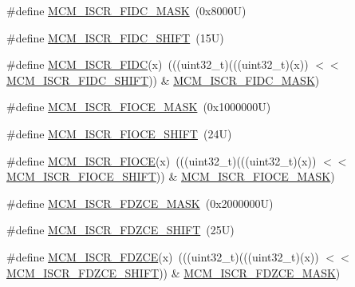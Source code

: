 \begin{DoxyCompactItemize}
\item 
\#define \mbox{\hyperlink{group___m_c_m___register___masks_gaeca36bf639a606a24f7ee6a4fc983528}{M\+C\+M\+\_\+\+I\+S\+C\+R\+\_\+\+F\+I\+D\+C\+\_\+\+M\+A\+SK}}~(0x8000\+U)
\item 
\#define \mbox{\hyperlink{group___m_c_m___register___masks_gaaf16fcce0e380e7f200d910008794028}{M\+C\+M\+\_\+\+I\+S\+C\+R\+\_\+\+F\+I\+D\+C\+\_\+\+S\+H\+I\+FT}}~(15\+U)
\item 
\#define \mbox{\hyperlink{group___m_c_m___register___masks_ga381a7d1a7455f77223d0ccdc4c99dfa3}{M\+C\+M\+\_\+\+I\+S\+C\+R\+\_\+\+F\+I\+DC}}(x)~(((uint32\+\_\+t)(((uint32\+\_\+t)(x)) $<$$<$ \mbox{\hyperlink{group___m_c_m___register___masks_gaaf16fcce0e380e7f200d910008794028}{M\+C\+M\+\_\+\+I\+S\+C\+R\+\_\+\+F\+I\+D\+C\+\_\+\+S\+H\+I\+FT}})) \& \mbox{\hyperlink{group___m_c_m___register___masks_gaeca36bf639a606a24f7ee6a4fc983528}{M\+C\+M\+\_\+\+I\+S\+C\+R\+\_\+\+F\+I\+D\+C\+\_\+\+M\+A\+SK}})
\item 
\#define \mbox{\hyperlink{group___m_c_m___register___masks_gaf48976f7ac1761a6145eea9a6add5ff5}{M\+C\+M\+\_\+\+I\+S\+C\+R\+\_\+\+F\+I\+O\+C\+E\+\_\+\+M\+A\+SK}}~(0x1000000\+U)
\item 
\#define \mbox{\hyperlink{group___m_c_m___register___masks_ga97f10ab969b7c83eb9cde216807b215b}{M\+C\+M\+\_\+\+I\+S\+C\+R\+\_\+\+F\+I\+O\+C\+E\+\_\+\+S\+H\+I\+FT}}~(24\+U)
\item 
\#define \mbox{\hyperlink{group___m_c_m___register___masks_ga40c85d16456dabfa6179d0a8fbc29d8b}{M\+C\+M\+\_\+\+I\+S\+C\+R\+\_\+\+F\+I\+O\+CE}}(x)~(((uint32\+\_\+t)(((uint32\+\_\+t)(x)) $<$$<$ \mbox{\hyperlink{group___m_c_m___register___masks_ga97f10ab969b7c83eb9cde216807b215b}{M\+C\+M\+\_\+\+I\+S\+C\+R\+\_\+\+F\+I\+O\+C\+E\+\_\+\+S\+H\+I\+FT}})) \& \mbox{\hyperlink{group___m_c_m___register___masks_gaf48976f7ac1761a6145eea9a6add5ff5}{M\+C\+M\+\_\+\+I\+S\+C\+R\+\_\+\+F\+I\+O\+C\+E\+\_\+\+M\+A\+SK}})
\item 
\#define \mbox{\hyperlink{group___m_c_m___register___masks_ga2ad0b7495aba7dacde7658c2a71db6bd}{M\+C\+M\+\_\+\+I\+S\+C\+R\+\_\+\+F\+D\+Z\+C\+E\+\_\+\+M\+A\+SK}}~(0x2000000\+U)
\item 
\#define \mbox{\hyperlink{group___m_c_m___register___masks_ga12ce128ef5d64154df362b12c33aa526}{M\+C\+M\+\_\+\+I\+S\+C\+R\+\_\+\+F\+D\+Z\+C\+E\+\_\+\+S\+H\+I\+FT}}~(25\+U)
\item 
\#define \mbox{\hyperlink{group___m_c_m___register___masks_gac82d36cc3bfeb92cf50ac3585324ac06}{M\+C\+M\+\_\+\+I\+S\+C\+R\+\_\+\+F\+D\+Z\+CE}}(x)~(((uint32\+\_\+t)(((uint32\+\_\+t)(x)) $<$$<$ \mbox{\hyperlink{group___m_c_m___register___masks_ga12ce128ef5d64154df362b12c33aa526}{M\+C\+M\+\_\+\+I\+S\+C\+R\+\_\+\+F\+D\+Z\+C\+E\+\_\+\+S\+H\+I\+FT}})) \& \mbox{\hyperlink{group___m_c_m___register___masks_ga2ad0b7495aba7dacde7658c2a71db6bd}{M\+C\+M\+\_\+\+I\+S\+C\+R\+\_\+\+F\+D\+Z\+C\+E\+\_\+\+M\+A\+SK}})
$$
\end{DoxyCompactItemize}
